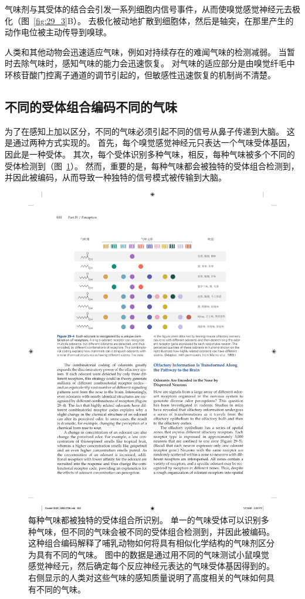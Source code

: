 气味剂与其受体的结合会引发一系列细胞内信号事件，从而使嗅觉感觉神经元去极化（图~\ref{fig:29_3}B）。
去极化被动地扩散到细胞体，然后是轴突，在那里产生的动作电位被主动传导到嗅球。


人类和其他动物会迅速适应气味，例如对持续存在的难闻气味的检测减弱。
当暂时去除气味时，感知气味的能力会迅速恢复。
对气味的适应部分是由嗅觉纤毛中环核苷酸门控离子通道的调节引起的，但敏感性迅速恢复的机制尚不清楚。



\subsection{不同的受体组合编码不同的气味}

为了在感知上加以区分，不同的气味必须引起不同的信号从鼻子传递到大脑。
这是通过两种方式实现的。
首先，每个嗅觉感觉神经元只表达一个气味受体基因，因此是一种受体。 
其次，每个受体识别多种气味，相反，每种气味被多个不同的受体检测到（图~\ref{fig:29_4}）。 
然而，重要的是，每种气味都会被独特的受体组合检测到，并因此被编码，从而导致一种独特的信号模式被传输到大脑。


\begin{figure}[htbp]
	\centering
	\includegraphics[width=0.8\linewidth]{chap29/fig_29_4}
	\caption{每种气味都被独特的受体组合所识别。
		单一的气味受体可以识别多种气味，但不同的气味会被不同的受体组合检测到，并因此被编码。
		这种组合编码解释了哺乳动物如何将具有相似化学结构的气味剂区分为具有不同的气味。
		图中的数据是通过用不同的气味测试小鼠嗅觉感觉神经元，然后确定每个反应神经元表达的气味受体基因得到的。
		右侧显示的人类对这些气味的感知质量说明了高度相关的气味如何具有不同的气味\cite{malnic1999combinatorial}。}
	\label{fig:29_4}
\end{figure}



